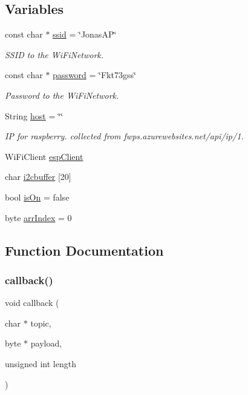 \subsection*{Variables}
\begin{DoxyCompactItemize}
\item 
const char $\ast$ \mbox{\hyperlink{_snap_box_8ino_a587ba0cb07f02913598610049a3bbb79}{ssid}} = \char`\"{}Jonas\+AP\char`\"{}
\begin{DoxyCompactList}\small\item\em S\+S\+ID to the Wi\+Fi\+Network. \end{DoxyCompactList}\item 
const char $\ast$ \mbox{\hyperlink{_snap_box_8ino_aa4a2ebcb494493f648ae1e6975672575}{password}} = \char`\"{}Fkt73gss\char`\"{}
\begin{DoxyCompactList}\small\item\em Password to the Wi\+Fi\+Network. \end{DoxyCompactList}\item 
String \mbox{\hyperlink{_snap_box_8ino_a2502b12b30261ef4dea2ff97a6b78cab}{host}} = \char`\"{}\char`\"{}
\begin{DoxyCompactList}\small\item\em IP for raspberry. collected from fwps.\+azurewebsites.\+net/api/ip/1. \end{DoxyCompactList}\item 
Wi\+Fi\+Client \mbox{\hyperlink{_snap_box_8ino_abd77e757e4b3bb6f1e4b42b21ea9e040}{esp\+Client}}
\item 
char \mbox{\hyperlink{_snap_box_8ino_affaea6d4a4cbfa87671e2929922c3d77}{i2cbuffer}} \mbox{[}20\mbox{]}
\item 
bool \mbox{\hyperlink{_snap_box_8ino_ae530c5af75c42fc2bd1fb588c38aa332}{is\+On}} = false
\item 
byte \mbox{\hyperlink{_snap_box_8ino_a9a1dfa6d1aaeda043479fb5d16e28a65}{arr\+Index}} = 0
\end{DoxyCompactItemize}


\subsection{Function Documentation}
\mbox{\label{_snap_box_8ino_ac3a129f66dc859e2b7279565f4e1de78}} 
\subsubsection{\texorpdfstring{callback()}{callback()}}
{\footnotesize\ttfamily void callback (\begin{DoxyParamCaption}\item[{char $\ast$}]{topic,  }\item[{byte $\ast$}]{payload,  }\item[{unsigned int}]{length }\end{DoxyParamCaption})}

